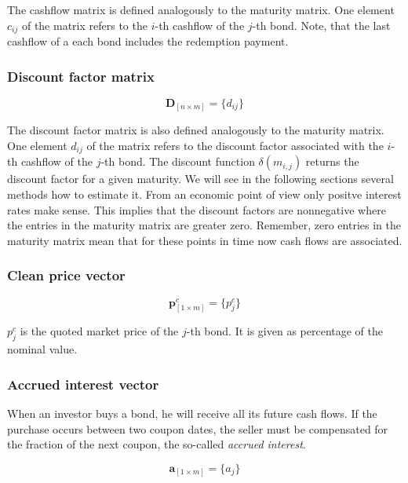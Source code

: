  The cashflow matrix is defined analogously to the maturity matrix.  One element $c_{ij}$  of the matrix refers to the $i$-th cashflow of the $j$-th bond. Note, that the last cashflow of a each bond includes the redemption payment.

\subsubsection*{Discount factor matrix}

 \begin{equation*}\label{discountm}
\bm{D}_{\left[n\times m\right]}= \{d_{ij}\}
\end{equation*}

The discount factor matrix is also defined analogously to the maturity matrix. One element $d_{ij}$ of the matrix refers to the discount factor associated with  the $i$-th cashflow of the $j$-th bond. The discount function $\delta(m_{i,j})$ returns the discount factor for a given maturity. We will see in the following sections several methods how to estimate it. From an economic point of view only positve interest rates make sense. This implies that the discount factors are nonnegative where the entries in the maturity matrix are greater zero. Remember, zero entries in the maturity matrix mean that for these points in time now cash flows are associated.

\subsubsection*{Clean price vector}

 \begin{equation*}\label{pc}
\bm{p}^c_{\left[1\times m\right]}= \{p^c_j\}
\end{equation*}

$p_{j}^c$ is the quoted market price of the $j$-th bond. It is given as percentage of the nominal value.

\subsubsection*{Accrued interest vector}

When an investor buys a bond, he will receive all its future cash flows. If the purchase occurs between two coupon dates, the seller must be compensated for the fraction of the next coupon, the so-called \emph{accrued interest}.

  \begin{equation*}\label{a}
\bm{a}_{\left[1\times m\right]}= \{a_j\}
\end{equation*}


